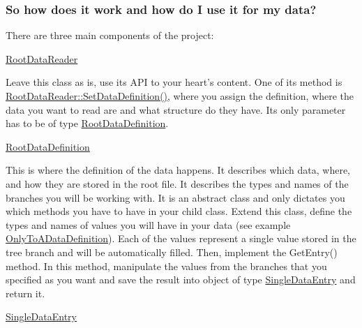  \subsubsection*{So how does it work and how do I use it for my data?}

There are three main components of the project\+:


\begin{DoxyItemize}
\item \hyperlink{classRootDataReader}{Root\+Data\+Reader}

Leave this class as is, use its A\+P\+I to your heart's content. One of its method is \hyperlink{classRootDataReader_ad670745df69f90ea6578d7c29cab716f}{Root\+Data\+Reader\+::\+Set\+Data\+Definition()}, where you assign the definition, where the data you want to read are and what structure do they have. Its only parameter has to be of type \hyperlink{classRootDataDefinition}{Root\+Data\+Definition}.
\item \hyperlink{classRootDataDefinition}{Root\+Data\+Definition}

This is where the definition of the data happens. It describes which data, where, and how they are stored in the root file. It describes the types and names of the branches you will be working with. It is an abstract class and only dictates you which methods you have to have in your child class. Extend this class, define the types and names of values you will have in your data (see example \hyperlink{classOnlyToADataDefinition}{Only\+To\+A\+Data\+Definition}). Each of the values represent a single value stored in the tree branch and will be automatically filled. Then, implement the Get\+Entry() method. In this method, manipulate the values from the branches that you specified as you want and save the result into object of type \hyperlink{classSingleDataEntry}{Single\+Data\+Entry} and return it.
\item \hyperlink{classSingleDataEntry}{Single\+Data\+Entry}


\end{DoxyItemize}
